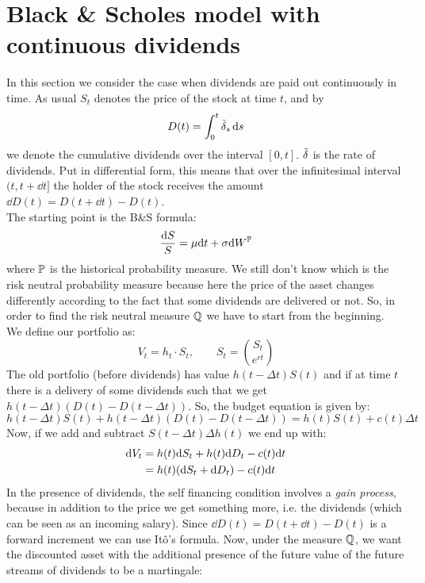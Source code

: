 \section{Black \& Scholes model with continuous dividends}\label{B&Swithdividends}
In this section we consider the case when dividends are paid out continuously in time. As usual $S_t$ denotes the price of the stock at time $t$, and by 
\begin{equation}
    D(t) = \int^t_0 \Tilde{\delta}_s \, \dd s    
\end{equation}{}
we denote the cumulative dividends over the interval $[0,t]$. $\Tilde{\delta}$ is the rate of dividends. Put in differential form, this means that over the infinitesimal interval $(t, t + \dd t]$ the holder of the stock receives the amount $\dd D(t) = D(t + \dd t) - D(t)$.\\
The starting point is the B\&S formula:
\begin{equation}
    \dfrac{\dd S}{S} = \mu\dd t + \sigma \dd W^{\mathbb{P}} 
\end{equation}
where $\mathbb{P}$ is the historical probability measure. We still don't know which is the risk neutral probability measure because here the price of the asset changes differently according to the fact that some dividends are delivered or not. So, in order to find the risk neutral measure $\mathbb{Q}$ we have to start from the beginning.\\
We define our portfolio as:
\begin{equation}
    V_t = h_t\cdot S_t, \qquad S_t = \binom{S_t}{e^{rt}}
\end{equation}
The old portfolio (before dividends) has value $h(t-\Delta t)S(t)$ and if at time $t$ there is a delivery of some dividends such that we get $h(t-\Delta t)(D(t)-D(t-\Delta t))$. So, the budget equation is given by:
\begin{equation}
    h(t-\Delta t)S(t) + h(t-\Delta t)(D(t)-D(t-\Delta t)) = h(t)S(t) + c(t)\Delta t
\end{equation}
Now, if we add and subtract $S(t-\Delta t)\Delta h(t)$ we end up with:
\begin{align}
    \notag\dd V_t &= h(t)\dd S_t + h(t)\dd D_t - c(t)\dd t \\
    &=
    h(t)(\dd S_t + \dd D_t) - c(t)\dd t 
\end{align}
In the presence of dividends, the self financing condition involves a \emph{gain process}, because in addition to the price we get something more, i.e. the dividends (which can be seen as an incoming salary). Since $\dd D(t) = D(t + \dd t) - D(t)$ is a forward increment we can use Itô's formula. Now, under the measure $\mathbb{Q}$, we want the discounted asset with the additional presence of the future value of the future streams of dividends to be a martingale: 
